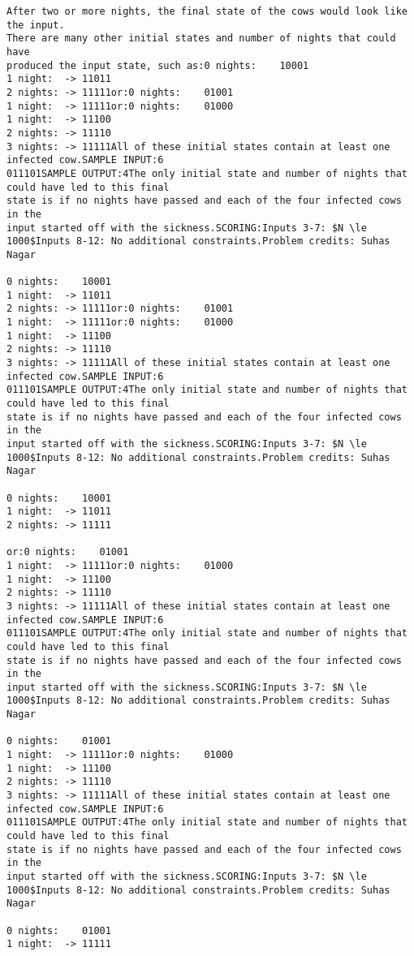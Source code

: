 \documentclass[12pt]{article}
\begin{document}
\begin{verbatim}
After two or more nights, the final state of the cows would look like the input.
There are many other initial states and number of nights that could have
produced the input state, such as:0 nights:    10001
1 night:  -> 11011
2 nights: -> 11111or:0 nights:    01001
1 night:  -> 11111or:0 nights:    01000
1 night:  -> 11100
2 nights: -> 11110
3 nights: -> 11111All of these initial states contain at least one infected cow.SAMPLE INPUT:6
011101SAMPLE OUTPUT:4The only initial state and number of nights that could have led to this final
state is if no nights have passed and each of the four infected cows in the
input started off with the sickness.SCORING:Inputs 3-7: $N \le 1000$Inputs 8-12: No additional constraints.Problem credits: Suhas Nagar

0 nights:    10001
1 night:  -> 11011
2 nights: -> 11111or:0 nights:    01001
1 night:  -> 11111or:0 nights:    01000
1 night:  -> 11100
2 nights: -> 11110
3 nights: -> 11111All of these initial states contain at least one infected cow.SAMPLE INPUT:6
011101SAMPLE OUTPUT:4The only initial state and number of nights that could have led to this final
state is if no nights have passed and each of the four infected cows in the
input started off with the sickness.SCORING:Inputs 3-7: $N \le 1000$Inputs 8-12: No additional constraints.Problem credits: Suhas Nagar

0 nights:    10001
1 night:  -> 11011
2 nights: -> 11111

or:0 nights:    01001
1 night:  -> 11111or:0 nights:    01000
1 night:  -> 11100
2 nights: -> 11110
3 nights: -> 11111All of these initial states contain at least one infected cow.SAMPLE INPUT:6
011101SAMPLE OUTPUT:4The only initial state and number of nights that could have led to this final
state is if no nights have passed and each of the four infected cows in the
input started off with the sickness.SCORING:Inputs 3-7: $N \le 1000$Inputs 8-12: No additional constraints.Problem credits: Suhas Nagar

0 nights:    01001
1 night:  -> 11111or:0 nights:    01000
1 night:  -> 11100
2 nights: -> 11110
3 nights: -> 11111All of these initial states contain at least one infected cow.SAMPLE INPUT:6
011101SAMPLE OUTPUT:4The only initial state and number of nights that could have led to this final
state is if no nights have passed and each of the four infected cows in the
input started off with the sickness.SCORING:Inputs 3-7: $N \le 1000$Inputs 8-12: No additional constraints.Problem credits: Suhas Nagar

0 nights:    01001
1 night:  -> 11111


\end{verbatim}
\end{document}

